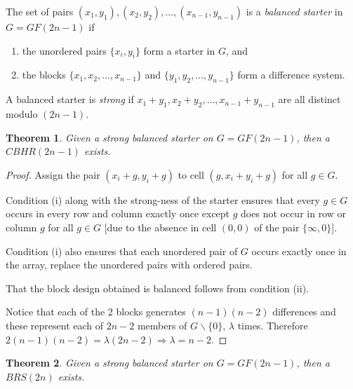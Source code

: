 \documentclass[
  11pt,
  a4paper]{book}
\newtheorem{theorem}{Theorem}
\begin{document}
The set of pairs
\((x_1, y_1), (x_2, y_2), \ldots, (x_{n - 1}, y_{n - 1})\)
is a \emph{balanced starter} in \(G = GF(2n - 1)\) if

\begin{enumerate}
\def\labelenumi{\arabic{enumi}.}
\item
  the unordered pairs \(\{x_i, y_i\}\) form a starter in
  \(G\), and
\item
  the blocks \(\{x_1, x_2, \ldots, x_{n - 1}\}\) and
  \(\{y_1, y_2, \ldots, y_{n - 1}\}\) form a difference system.
\end{enumerate}

A balanced starter is \emph{strong} if
\(x_1 + y_1, x_2 + y_2, \ldots, x_{n - 1} + y_{n - 1}\) are
all distinct modulo \((2n - 1)\).

\begin{theorem}
Given a strong balanced starter on $G = GF(2n - 1)$, then
a $CBHR(2n - 1)$ exists.
\end{theorem}

\begin{proof}
Assign the pair $(x_i + g, y_i + g)$ to cell
$(g, x_i + y_i + g)$ for all $g \in G$.

Condition (i) along with the strong-ness of
the starter ensures that every $g \in G$ occurs in every row
and column exactly once except $g$ does not occur in row or
column $g$ for all $g \in G$ [due to the absence in cell
$(0, 0)$ of the pair $\{\infty, 0\}$].

Condition (i) also ensures that each unordered pair of $G$
occurs exactly once in the array, replace the unordered
pairs with ordered pairs.

That the block design obtained is balanced follows
from condition (ii).

Notice that each of the 2 blocks
generates $(n - 1)(n - 2)$ differences and these represent each
of $2n - 2$ members of $G \backslash \{0\}$, $\lambda$ times.
Therefore $2(n - 1)(n - 2) = \lambda (2n - 2) \Rightarrow \lambda = n-2$.
\end{proof}

\begin{theorem}
Given a strong balanced starter on $G = GF(2n - 1)$, then a
$BRS(2n)$ exists.
\end{theorem}
\end{document}
